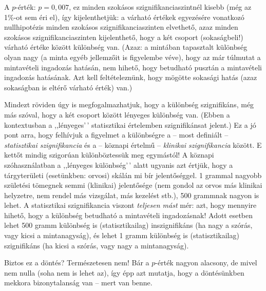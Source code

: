 \documentclass[
]{book}
\begin{document}
A \(p\)-érték: \(p=0,\!007\), ez minden szokásos szignifikanciaszintnél kisebb (még az 1\%-ot sem éri el), így kijelenthetjük: a várható értékek egyezésére vonatkozó nullhipotézis minden szokásos szignifikanciaszinten elvethető, azaz minden szokásos szignifikanciaszinten kijelenthető, hogy a két csoport (sokaságbeli!) várható értéke között különbség van. (Azaz: a mintában tapasztalt különbség olyan nagy (a minta egyéb jellemzőit is figyelembe véve), hogy az már túlmutat a mintavételi ingadozás hatásán, nem hihető, hogy betudható pusztán a mintavételi ingadozás hatásának. Azt kell feltételeznünk, hogy mögötte sokasági hatás (azaz sokaságban is eltérő várható érték) van.)

Mindezt röviden úgy is megfogalmazhatjuk, hogy a különbség szignifikáns, még más szóval, hogy a két csoport között lényeges különbség van. (Ebben a kontextusban a ,,lényeges'\,' statisztikai értelemben szignifikánsat jelent.) Ez a jó pont arra, hogy felhívjuk a figyelmet a különbségre a -- most definiált -- \emph{statisztikai szignifikancia} és a -- köznapi értelmű -- \emph{klinikai szignifikancia} között. E kettőt mindig szigorúan különböztessük meg egymástól! A köznapi szóhasználatban a ,,lényeges különbség'\,' alatt ugyanis azt értjük, hogy a tárgyterületi (esetünkben: orvosi) skálán mi bír jelentőséggel. 1 grammal nagyobb születési tömegnek semmi (klinikai) jelentősége (nem gondol az orvos más klinikai helyzetre, nem rendel más vizsgálat, más kezelést stb.), 500 grammnak nagyon is lehet. A statisztikai szignifikancia viszont \emph{teljesen mást} mér: azt, hogy mennyire hihető, hogy a különbség betudható a mintavételi ingadozásnak! Adott esetben lehet 500 gramm különbség is (statisztikailag) inszignifikáns (ha nagy a szórás, vagy kicsi a mintanagyság), és lehet 1 gramm különbség is (statisztikailag) szignifikáns (ha kicsi a szórás, vagy nagy a mintanagyság).

Biztos ez a döntés? Természetesen nem! Bár a \(p\)-érték nagyon alacsony, de mivel nem nulla (soha nem is lehet az), így épp azt mutatja, hogy a döntésünkben mekkora bizonytalanság van -- mert van benne.
\end{document}
